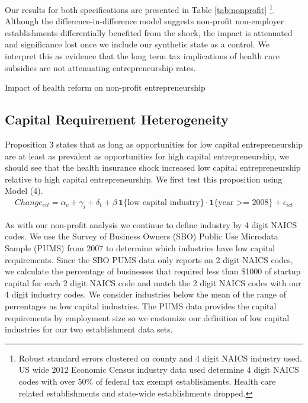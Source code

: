 \documentclass[12pt]{article}
\begin{document}
Our results for both specifications are presented in Table \ref{tab:nonprofit} \footnote{Robust standard errors clustered on county and 4 digit NAICS industry used. US wide 2012 Economic Census industry data used determine 4 digit NAICS codes with over 50\% of federal tax exempt establishments. Health care related establishments and state-wide establishments dropped.}. Although the difference-in-difference model suggests non-profit non-employer establishments differentially benefited from the shock, the impact is attenuated and significance lost once we include our synthetic state as a control. We interpret this as evidence that the long term tax implications of health care subsidies are not attenuating entrepreneurship rates. 

\begin{table}[H]
	\centering
	
	\caption{Impact of health reform on non-profit entrepreneurship}
	\label{tab:nonprofit}
\end{table}

\subsection{Capital Requirement Heterogeneity}

Proposition 3 states that as long as opportunities for low capital entrepreneurship are at least as prevalent as opportunities for high capital entrepreneurship, we should see that the health insurance shock increased low capital entrepreneurship relative to high capital entrepreneurship. We first test this proposition using Model (4). 
\begin{align}
Change_{cit} =  \alpha_c + \gamma_i+ \delta_t + \beta \, \mathbf{1}\{\text{low capital industry}\} \cdot \mathbf{1}\{\text{year >= 2008}\} + \epsilon_{ict}
\end{align}

As with our non-profit analysis we continue to define industry by 4 digit NAICS codes. We use the Survey of Business Owners (SBO) Public Use Microdata Sample (PUMS) from 2007 to determine which industries have low capital requirements. Since the SBO PUMS data only reports on 2 digit NAICS codes, we calculate the percentage of businesses that required less than \$1000 of startup capital for each 2 digit NAICS code and match the 2 digit NAICS codes with our 4 digit industry codes. We consider industries below the mean of the range of percentages as low capital industries. The PUMS data provides the capital requirements by employment size so we customize our definition of low capital industries for our two establishment data sets. 
\end{document}
